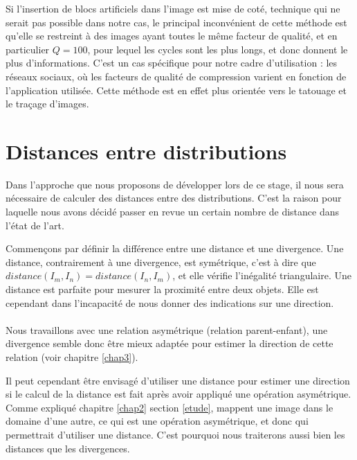 \documentclass[utf8,final]{stageM2R} %
\begin{document}
Si l'insertion de blocs artificiels dans l'image est mise de coté, technique qui ne serait pas possible dans notre cas, le principal inconvénient de cette méthode 
 est qu'elle se restreint à des images ayant toutes le même facteur de qualité, et en particulier $Q = 100$, pour lequel les cycles sont les plus longs, et donc donnent le plus d'informations. C'est un cas spécifique pour notre cadre d'utilisation : les réseaux sociaux, où les facteurs de qualité de compression varient en fonction de l'application utilisée. Cette méthode est en effet plus orientée vers le tatouage et le traçage d'images.

\section{Distances entre distributions}

Dans l'approche que nous proposons de développer lors de ce stage, il nous sera nécessaire de calculer des distances entre des distributions. C'est la raison pour laquelle nous avons décidé passer en revue un certain nombre de distance dans l'état de l'art.

Commençons par définir la différence entre une distance et une divergence. Une distance, contrairement à une divergence, est symétrique, c'est à dire que $distance(I_{m},I_{n}) = distance(I_{n},I_{m})$, et elle vérifie l'inégalité triangulaire. Une distance est parfaite pour mesurer la proximité entre deux objets. Elle est cependant dans l'incapacité de nous donner des indications sur une direction.

\paragraph{}

Nous travaillons avec une relation asymétrique (relation parent-enfant), une divergence semble donc être mieux adaptée pour estimer la direction de cette relation (voir chapitre \ref{chap3}).

Il peut cependant être envisagé d'utiliser une distance pour estimer une direction si le calcul de la distance est fait après avoir appliqué une opération asymétrique. Comme expliqué chapitre \ref{chap2} section \ref{etude},  mappent une image dans le domaine d'une autre, ce qui est une opération asymétrique, et donc qui permettrait d'utiliser une distance. C'est pourquoi nous traiterons aussi bien les distances que les divergences.
\end{document}
